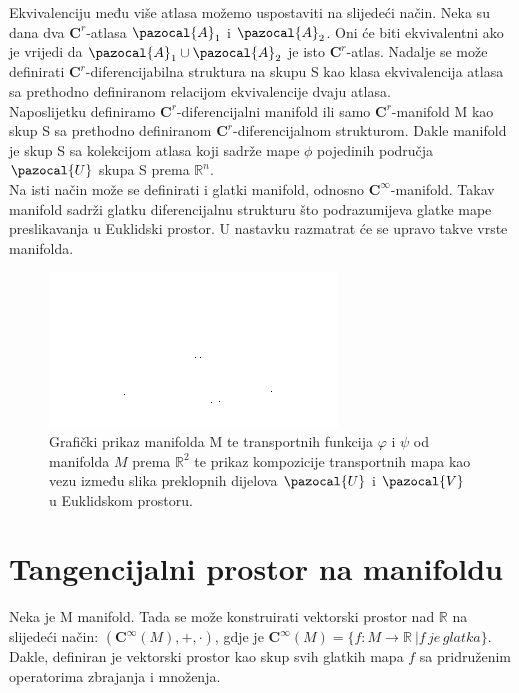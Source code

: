 \documentclass[times, utf8, diplomski, numeric]{fer}
\newcommand{\Va}{\pazocal{V}}
\newcommand{\Ua}{\pazocal{U}}
\newcommand{\Aa}{\pazocal{A}}
\begin{document}
	Ekvivalenciju među više atlasa možemo uspostaviti na slijedeći način. Neka su dana dva $\boldsymbol{C}^r$-atlasa $\Aa_1$ i $\Aa_2$. Oni će biti ekvivalentni ako je vrijedi da $\Aa_1 \cup \Aa_2$ je isto $\boldsymbol{C}^r$-atlas. Nadalje se može definirati $\boldsymbol{C}^r$-diferencijabilna struktura na skupu S kao klasa ekvivalencija atlasa sa prethodno definiranom relacijom ekvivalencije dvaju atlasa. \\
	Naposlijetku definiramo $\boldsymbol{C}^r$-diferencijalni manifold ili samo $\boldsymbol{C}^r$-manifold M kao skup S sa prethodno definiranom $\boldsymbol{C}^r$-diferencijalnom strukturom. Dakle manifold je skup S sa kolekcijom atlasa koji sadrže mape $\phi$ pojedinih područja $\Ua$ skupa S prema $\mathbb{R}^n$. \\
	Na isti način može se definirati i glatki manifold, odnosno $\boldsymbol{C}^\infty$-manifold. Takav manifold sadrži glatku diferencijalnu strukturu što podrazumijeva glatke mape preslikavanja u Euklidski prostor. U nastavku razmatrat će se upravo takve vrste manifolda.
	
	\begin{figure}[h]
		\includegraphics[width=\textwidth]{figures/fig_overlap_charts.png}
		\caption{Grafički prikaz manifolda M te transportnih funkcija $\varphi$ i $\psi$ od manifolda $M$ prema $\mathbb{R}^2$ te prikaz kompozicije transportnih mapa kao vezu između slika preklopnih dijelova $\Ua$ i $\Va$ u Euklidskom prostoru.}
	\end{figure}

\section{Tangencijalni prostor na manifoldu}

	Neka je M manifold. Tada se može konstruirati vektorski prostor nad $\mathbb{R}$ na slijedeći način: $(\boldsymbol{C}^\infty(M), +, \cdot)$, gdje je $\boldsymbol{C}^\infty(M) = \{ f: M \rightarrow \mathbb{R} \ | f \,je\, glatka\}$. Dakle, definiran je vektorski prostor kao skup svih glatkih mapa $f$ sa pridruženim operatorima zbrajanja i množenja. 
	
\end{document}

